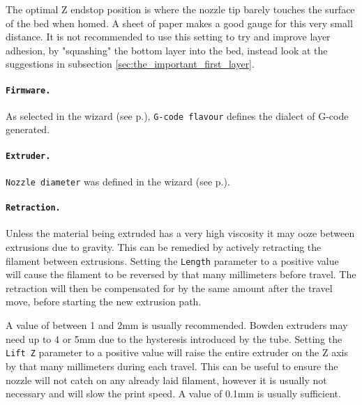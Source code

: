The optimal Z endstop position is where the nozzle tip barely touches the surface of the bed when homed.  A sheet of paper makes a good gauge for this very small distance.  It is not recommended to use this setting to try and improve layer adhesion, by "squashing" the bottom layer into the bed, instead look at the suggestions in subsection \ref{sec:the_important_first_layer}.

\paragraph{\texttt{Firmware.}} %
\label{par:firmware}
As selected in the wizard (see p.\pageref{sub:1_firmware_type}), \texttt{G-code flavour} defines the dialect of G-code generated.


\paragraph{\texttt{Extruder.}} %
\label{par:extruder}
\texttt{Nozzle diameter} was defined in the wizard (see p.\pageref{sub:3_nozzle_diameter}).

\paragraph{\texttt{Retraction.}} %
\label{par:retraction}
Unless the material being extruded has a very high viscosity it may ooze between extrusions due to gravity.  This can be remedied by actively retracting the filament between extrusions.  Setting the \texttt{Length} parameter to a positive value will cause the filament to be reversed by that many millimeters before travel.  The retraction will then be compensated for by the same amount after the travel move, before starting the new extrusion path.

A value of between 1 and 2mm is usually recommended. Bowden extruders may need up to 4 or 5mm due to the hysteresis introduced by the tube.
Setting the \texttt{Lift Z} parameter to a positive value will raise the entire extruder on the Z axis by that many millimeters during each travel.  This can be useful to ensure the nozzle will not catch on any already laid filament, however it is usually not necessary and will slow the print speed.  A value of 0.1mm is usually sufficient.

